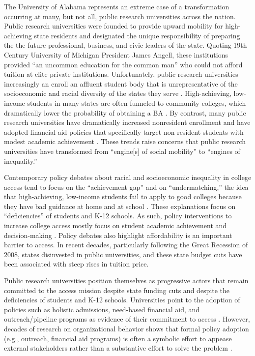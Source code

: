 \documentclass[twoside]{article}
\begin{document}
The University of Alabama represents an extreme case of a transformation occurring at many, but not all, public research universities across the nation.  Public research universities were founded to provide upward mobility for high-achieving state residents \citep{RN2269} and designated the unique responsibility of preparing the the future professional, business, and civic leaders of the state.  Quoting 19th Century University of Michigan President James Angell, these institutions provided ``an uncommon education for the common man'' \citep[as cited in][p. 279]{RN3608} who could not afford tuition at elite private institutions.  Unfortunately, public research universities increasingly an enroll an affluent student body that is unrepresentative of the socioeconomic and racial diversity of the states they serve \citep{RN3685,RN4247}. High-achieving, low-income students in many states are often funneled to community colleges, which dramatically lower the probability of obtaining a BA \citep{RN2261}. By contrast, many public research universities have dramatically increased nonresident enrollment \citep{RN3753} and have adopted financial aid policies that specifically target non-resident students with modest academic achievement \citep{RN1469,RN3762,RN4032,RN4409}. These trends raise concerns that public research universities have transformed from ``engine[s] of social mobility'' \citep[][p. 3]{RN1149} to ``engines of inequality.''

Contemporary policy debates about racial and socioeconomic inequality in college access tend to focus on the ``achievement gap'' and on ``undermatching,'' the idea that high-achieving, low-income students fail to apply to good colleges because they have bad guidance at home and at school \citep{RN4016}.  These explanations focus on ``deficiencies'' of students and K-12 schools. As such, policy interventions to increase college access mostly focus on student academic achievement and decision-making \citep{RN4351}. Policy debates also highlight affordability is an important barrier to access. In recent decades, particularly following the Great Recession of 2008, states disinvested in public universities, and these state budget cuts have been associated with steep rises in tuition price. 

Public research universities position themselves as progressive actors that remain committed to the access mission despite state funding cuts and despite the deficiencies of students and K-12 schools. Universities point to the adoption of policies such as holistic admissions, need-based financial aid, and outreach/pipeline programs as evidence of their commitment to access \citep{RN4017}.  However, decades of research on organizational behavior shows that formal policy adoption (e.g., outreach, financial aid programs) is often a symbolic effort to appease external stakeholders rather than a substantive effort to solve the problem \citep{RN2436}.
\end{document}
